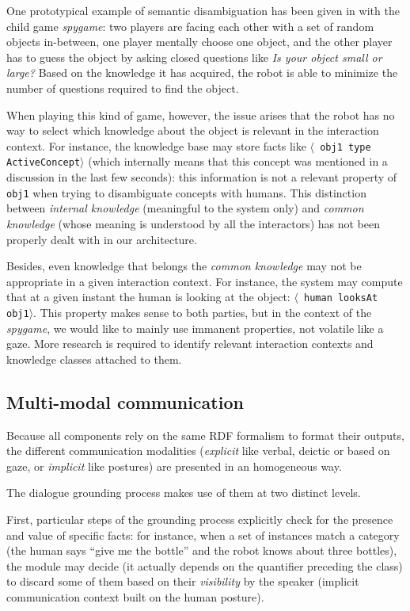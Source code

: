 \documentclass[letterpaper, 10 pt, conference]{ieeeconf}  %
\newcommand{\concept}[1]{{\small \texttt{#1}}}
\newcommand{\stmt}[1]{{\footnotesize \tt $\langle$ #1\relax$\rangle$}}
\begin{document}
One prototypical example of semantic disambiguation has been given in
\cite{Ros2010b} with the child game \emph{spygame}: two players are facing
each other with a set of random objects in-between, one player mentally choose
one object, and the other player has to guess the object by asking closed
questions like \emph{Is your object small or large?} Based on the knowledge it
has acquired, the robot is able to minimize the number of questions required to
find the object.

When playing this kind of game, however, the issue arises that the robot has no
way to select which knowledge about the object is relevant in the interaction
context. For instance, the knowledge base may store facts like \stmt{obj1 type
ActiveConcept} (which internally means that this concept was mentioned in a
discussion in the last few seconds): this information is not a relevant
property of \concept{obj1} when trying to disambiguate concepts with humans.
This distinction between \emph{internal knowledge} (meaningful to
the system only) and \emph{common knowledge} (whose meaning is understood by
all the interactors) has not been properly dealt with in our architecture.

Besides, even knowledge that belongs the \emph{common knowledge} may not be
appropriate in a given interaction context. For instance, the system may
compute that at a given instant the human is looking at the object: \stmt{human
looksAt obj1}. This property makes sense to both parties, but in the context of
the \emph{spygame}, we would like to mainly use immanent properties, not
volatile like a gaze. More research is required to identify relevant
interaction contexts and knowledge classes attached to them.

\subsection{Multi-modal communication}

Because all components rely on the same RDF formalism to format their outputs,
the different communication modalities (\emph{explicit} like verbal, deictic or
based on gaze, or \emph{implicit} like postures) are presented in an
homogeneous way.

The dialogue grounding process makes use of them at two distinct levels.

First, particular steps of the grounding process explicitly check for the
presence and value of specific facts: for instance, when a set of instances
match a category (the human says ``give me the bottle'' and the robot knows
about three bottles), the module may decide (it actually depends on the
quantifier preceding the class) to discard some of them based on their
\emph{visibility} by the speaker (implicit communication context built on the
human posture).
\end{document}

